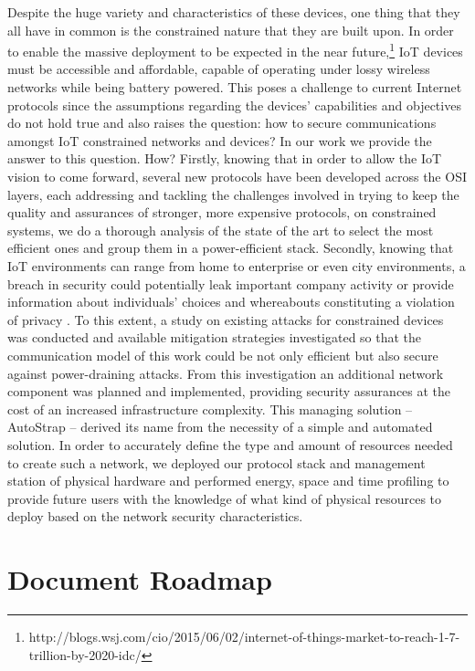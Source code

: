 Despite the huge variety and characteristics of these devices, one thing that they all have in common is the constrained nature that they are built upon. In order to enable the massive deployment to be expected in the near future,\footnote{http://blogs.wsj.com/cio/2015/06/02/internet-of-things-market-to-reach-1-7-trillion-by-2020-idc/} \gls{IoT} devices must be accessible and affordable, capable of operating under lossy wireless networks while being battery powered. This poses a challenge to current Internet protocols since the assumptions regarding the devices' capabilities and objectives do not hold true \cite{Trappe2015} and also raises the question: how to secure communications amongst \gls{IoT} constrained networks and devices? In our work we provide the answer to this question. How? Firstly, knowing that in order to allow the \gls{IoT} vision to come forward, several new protocols have been developed across the OSI layers, each addressing and tackling the challenges involved in trying to keep the quality and assurances of stronger, more expensive protocols, on constrained systems, we do a thorough analysis of the state of the art to select the most efficient ones and group them in a power-efficient stack. Secondly, knowing that \gls{IoT} environments can range from home to enterprise or even city environments, a breach in security could potentially leak important company activity or provide information about individuals' choices and whereabouts constituting a violation of privacy \cite{Ukil2015}. To this extent, a study on existing attacks for constrained devices was conducted and available mitigation strategies investigated so that the communication model of this work could be not only efficient but also secure against power-draining attacks. From this investigation an additional network component was planned and implemented, providing security assurances at the cost of an increased infrastructure complexity. This managing solution -- AutoStrap -- derived its name from the necessity of a simple and automated solution. In order to accurately define the type and amount of resources needed to create such a network, we deployed our protocol stack and management station of physical hardware and performed energy, space and time profiling to provide future users with the knowledge of what kind of physical resources to deploy based on the network security characteristics.

\section{Document Roadmap}

